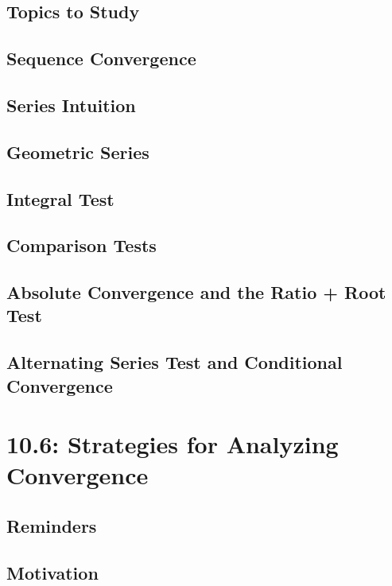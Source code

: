 \documentclass{report}
\begin{document}
\begin{sloppypar}
\section{Topics to Study}

\section{Sequence Convergence}
\section{Series Intuition}
\section{Geometric Series}
\section{Integral Test}
\section{Comparison Tests}
\section{Absolute Convergence and the Ratio + Root Test}
\section{Alternating Series Test and Conditional
  Convergence}
\section{}

\chapter{10.6: Strategies for Analyzing Convergence}
\section{Reminders}
\section{Motivation}




\end{sloppypar}
\end{document}
